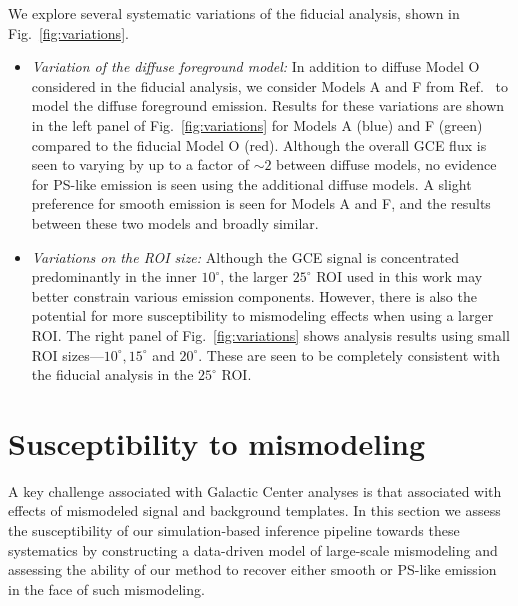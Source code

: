 \documentclass[prd,aps,10pt,nofootinbib,twocolumn,superscriptaddress,preprintnumbers,balancelastpage,longbibliography]{revtex4-1}
\begin{document}
We explore several systematic variations of the fiducial analysis, shown in Fig.~\ref{fig:variations}.

\begin{itemize}
    \item \emph{Variation of the diffuse foreground model:} In addition to diffuse Model O considered in the fiducial analysis, we consider Models A and F from Ref.~\cite{} to model the diffuse foreground emission. Results for these variations are shown in the left panel of Fig.~\ref{fig:variations} for Models A (blue) and F (green) compared to the fiducial Model O (red). Although the overall GCE flux is seen to varying by up to a factor of $\sim2$ between diffuse models, no evidence for PS-like emission is seen using the additional diffuse models. A slight preference for smooth emission is seen for Models A and F, and the results between these two models and broadly similar. 
    \item \emph{Variations on the ROI size:} Although the GCE signal is concentrated predominantly in the inner $10^\circ$, the larger $25^\circ$ ROI used in this work may better constrain various emission components. However, there is also the potential for more susceptibility to mismodeling effects when using a larger ROI. The right panel of Fig.~\ref{fig:variations} shows analysis results using small ROI sizes---$10^\circ, 15^\circ$ and $20^\circ$. These are seen to be completely consistent with the fiducial analysis in the $25^\circ$ ROI.
\end{itemize}


\section{Susceptibility to mismodeling}
\label{sec:mismodeling}

A key challenge associated with Galactic Center analyses is that associated with effects of mismodeled signal and background templates. In this section we assess the susceptibility of our simulation-based inference pipeline towards these systematics by constructing a data-driven model of large-scale mismodeling and assessing the ability of our method to recover either smooth or PS-like emission in the face of such mismodeling. 
\end{document}
